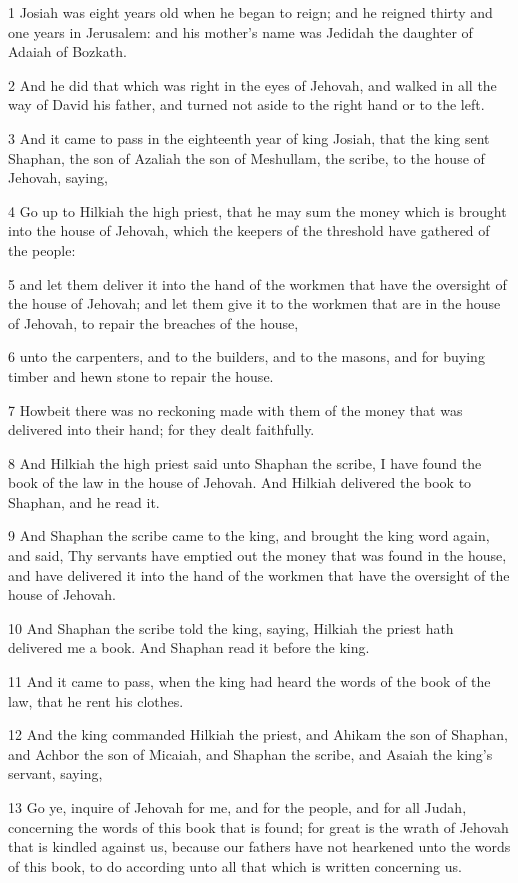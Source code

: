\par 1 Josiah was eight years old when he began to reign; and he reigned thirty and one years in Jerusalem: and his mother's name was Jedidah the daughter of Adaiah of Bozkath.
\par 2 And he did that which was right in the eyes of Jehovah, and walked in all the way of David his father, and turned not aside to the right hand or to the left.
\par 3 And it came to pass in the eighteenth year of king Josiah, that the king sent Shaphan, the son of Azaliah the son of Meshullam, the scribe, to the house of Jehovah, saying,
\par 4 Go up to Hilkiah the high priest, that he may sum the money which is brought into the house of Jehovah, which the keepers of the threshold have gathered of the people:
\par 5 and let them deliver it into the hand of the workmen that have the oversight of the house of Jehovah; and let them give it to the workmen that are in the house of Jehovah, to repair the breaches of the house,
\par 6 unto the carpenters, and to the builders, and to the masons, and for buying timber and hewn stone to repair the house.
\par 7 Howbeit there was no reckoning made with them of the money that was delivered into their hand; for they dealt faithfully.
\par 8 And Hilkiah the high priest said unto Shaphan the scribe, I have found the book of the law in the house of Jehovah. And Hilkiah delivered the book to Shaphan, and he read it.
\par 9 And Shaphan the scribe came to the king, and brought the king word again, and said, Thy servants have emptied out the money that was found in the house, and have delivered it into the hand of the workmen that have the oversight of the house of Jehovah.
\par 10 And Shaphan the scribe told the king, saying, Hilkiah the priest hath delivered me a book. And Shaphan read it before the king.
\par 11 And it came to pass, when the king had heard the words of the book of the law, that he rent his clothes.
\par 12 And the king commanded Hilkiah the priest, and Ahikam the son of Shaphan, and Achbor the son of Micaiah, and Shaphan the scribe, and Asaiah the king's servant, saying,
\par 13 Go ye, inquire of Jehovah for me, and for the people, and for all Judah, concerning the words of this book that is found; for great is the wrath of Jehovah that is kindled against us, because our fathers have not hearkened unto the words of this book, to do according unto all that which is written concerning us.
